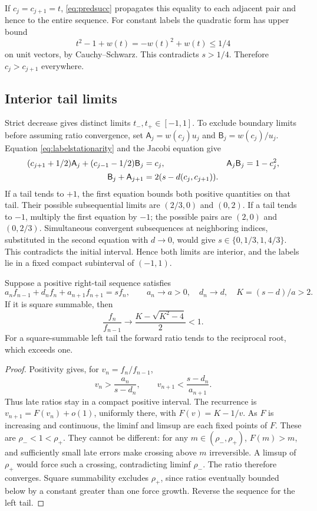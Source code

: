 If \(c_j=c_{j+1}=t\), \eqref{eq:predsucc} propagates this equality
to each adjacent pair and hence to the entire sequence. For constant
labels the quadratic form has upper bound
\[
 t^2-1+w(t)=-w(t)^2+w(t)\le1/4
\]
on unit vectors, by Cauchy--Schwarz. This contradicts \(s>1/4\).
Therefore \(c_j>c_{j+1}\) everywhere.

\subsection{Interior tail limits}
Strict decrease gives distinct limits \(t_-,t_+\in[-1,1]\).
To exclude boundary limits before assuming ratio convergence, set
\(\mathsf A_j=w(c_j)u_j\) and \(\mathsf B_j=w(c_j)/u_j\).
Equation \eqref{eq:labelstationarity} and the Jacobi equation give
\begin{align}
 (c_{j+1}+1/2)\mathsf A_j+(c_{j-1}-1/2)\mathsf B_j&=c_j,
 &\mathsf A_j\mathsf B_j&=1-c_j^2,\label{eq:AB}\\
 \mathsf B_j+\mathsf A_{j+1}&=2(s-d(c_j,c_{j+1})).&&\notag
\end{align}
If a tail tends to \(+1\), the first equation bounds both positive
quantities on that tail. Their possible subsequential limits are
\((2/3,0)\) and \((0,2)\). If a tail tends to \(-1\), multiply the
first equation by \(-1\); the possible pairs are \((2,0)\) and
\((0,2/3)\). Simultaneous convergent subsequences at neighboring indices,
substituted in the second equation with \(d\to0\), would give
\(s\in\{0,1/3,1,4/3\}\). This contradicts the initial interval.
Hence both limits are interior, and the labels lie in a fixed compact
subinterval of \((-1,1)\).

\begin{lemma}\label{lem:ratios}
Suppose a positive right-tail sequence satisfies
\[
 a_nf_{n-1}+d_nf_n+a_{n+1}f_{n+1}=sf_n,\qquad
 a_n\to a>0,\quad d_n\to d,\quad K=(s-d)/a>2.
\]
If it is square summable, then
\[
 \frac{f_n}{f_{n-1}}\longrightarrow
 \frac{K-\sqrt{K^2-4}}2<1.
\]
For a square-summable left tail the forward ratio tends to the
reciprocal root, which exceeds one.
\end{lemma}
\begin{proof}
Positivity gives, for \(v_n=f_n/f_{n-1}\),
\[
 v_n>\frac{a_n}{s-d_n},\qquad
 v_{n+1}<\frac{s-d_n}{a_{n+1}}.
\]
Thus late ratios stay in a compact positive interval. The recurrence is
\(v_{n+1}=F(v_n)+o(1)\), uniformly there, with \(F(v)=K-1/v\).
As \(F\) is increasing and continuous, the liminf and limsup are each
fixed points of \(F\). These are \(\rho_-<1<\rho_+\).
They cannot be different: for any \(m\in(\rho_-,\rho_+)\),
\(F(m)>m\), and sufficiently small late errors make crossing above
\(m\) irreversible. A limsup of \(\rho_+\) would force such a crossing,
contradicting liminf \(\rho_-\). The ratio therefore converges.
Square summability excludes \(\rho_+\), since ratios eventually bounded
below by a constant greater than one force growth. Reverse the sequence
for the left tail.
\end{proof}

